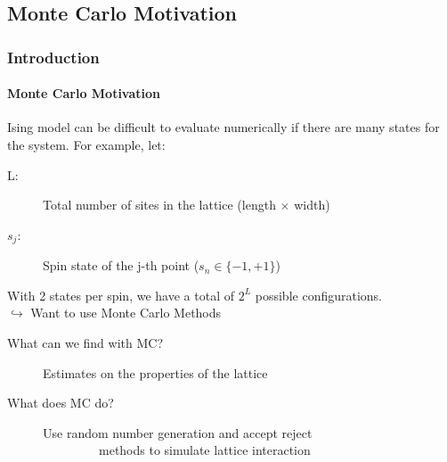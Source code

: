 \documentclass[11pt,notes]{beamer}
\begin{document}
\begin{frame}
\end{frame}

\subsection{Monte Carlo Motivation}
\begin{frame}
\frametitle{Introduction}
\framesubtitle{Monte Carlo Motivation}
Ising model can be difficult to evaluate numerically if there are many states for the system. For example, let:\\
\begin{description}
	\item[L:] Total number of sites in the lattice (length $\times$ width)
	\item[$s_{j}$:] Spin state of the j-th point ($s_{n} \in \{-1,+1\}$)
\end{description}
With 2 states per spin, we have a total of $2^{L}$ possible configurations.\\
$\hookrightarrow$ Want to use Monte Carlo Methods
\begin{description}
	\item[What can we find with MC?] Estimates on the properties of the lattice
	\item[What does MC do?] Use random number generation and accept reject\\ \ \ \ \ \ \ \ \ \ methods to simulate lattice interaction
\end{description}
\end{frame}
\end{document}

